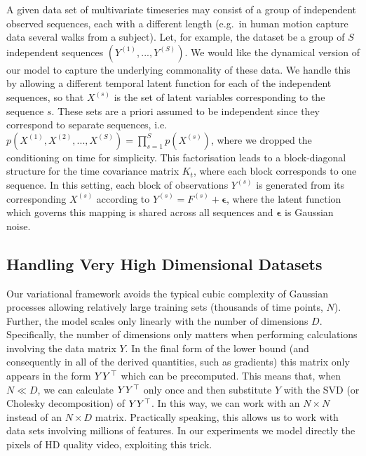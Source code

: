 \documentclass [10pt , a4paper]{article}
\begin{document}
A given data set of multivariate timeseries
may consist of a group of independent observed sequences, each with
a different length (e.g.\ in human motion capture data several walks
from a subject). Let, for example, the dataset be a group of
$S$ independent sequences  $\left( Y^{(1)}, ..., Y^{(S)} \right)$. We would like the dynamical version of our
model to capture the underlying
commonality of these data. We handle this by allowing a different temporal latent function for each of the independent
sequences, so that $X^{(s)}$ is the set of latent variables corresponding to the sequence $s$.
%
These sets are a priori assumed to be independent since they correspond to separate sequences,
i.e.\ $p\left( X^{(1)}, X^{(2)}, ..., X^{(S)} \right) = \prod_{s=1}^S p(X^{(s)})$, where we dropped the
conditioning on time for simplicity.
%
This factorisation leads to a block-diagonal structure for the time covariance matrix $K_t$, where each block corresponds to one sequence.
 In this setting, each block of observations $Y^{(s)}$ is generated from its corresponding $X^{(s)}$
according to $Y^{(s)} = F^{(s)} + \boldsymbol \epsilon$, where the latent function which governs this mapping is shared across all sequences and 
$\boldsymbol \epsilon$ is Gaussian noise. 


\subsection{Handling Very High Dimensional Datasets}

Our variational framework avoids the typical cubic complexity of
Gaussian processes allowing relatively large training sets (thousands
of time points, $N$). Further, the model scales only linearly with the
number of dimensions $D$. Specifically, the number of dimensions only
matters when performing calculations involving the data matrix $Y$. In
the final form of the lower bound (and consequently in all of the
derived quantities, such as gradients) this matrix only appears in the
form $Y Y^{\top}$ which can be precomputed. This means that, when $N \ll
D$, we can calculate $Y Y^{\top}$ only once and then substitute $Y$ with
the SVD (or Cholesky decomposition) of $Y Y^{\top}$. In this way, we can
work with an $N \times N$ instead of an $N \times D$
matrix. Practically speaking, this allows us to work with data sets
involving millions of features. In our experiments we model directly
the pixels of HD quality video, exploiting this trick.
\end{document}
